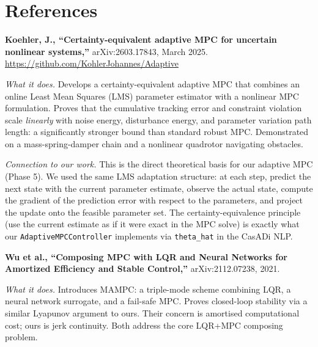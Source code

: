 \documentclass[12pt,a4paper]{article}
\begin{document}
\section*{References}

\begin{enumerate}[label={[\arabic*]}, leftmargin=1.5cm, itemsep=10pt]

  \item \textbf{Koehler, J., ``Certainty-equivalent adaptive MPC for uncertain
    nonlinear systems,''} arXiv:2603.17843, March 2025.
    \url{https://github.com/KohlerJohannes/Adaptive}

  \textit{What it does.}
  Develops a certainty-equivalent adaptive MPC that combines an online
  Least Mean Squares (LMS) parameter estimator with a nonlinear MPC
  formulation. Proves that the cumulative tracking error and constraint
  violation scale \emph{linearly} with noise energy, disturbance energy,
  and parameter variation path length: a significantly stronger bound
  than standard robust MPC. Demonstrated on a mass-spring-damper chain and
  a nonlinear quadrotor navigating obstacles.

  \textit{Connection to our work.}
  This is the direct theoretical basis for our adaptive MPC (Phase 5). We
  used the same LMS adaptation structure: at each step, predict the next
  state with the current parameter estimate, observe the actual state,
  compute the gradient of the prediction error with respect to the
  parameters, and project the update onto the feasible parameter set.
  The certainty-equivalence principle (use the current estimate as if it
  were exact in the MPC solve) is exactly what our \texttt{AdaptiveMPCController}
  implements via \texttt{theta\_hat} in the CasADi NLP.

  \medskip

  \item \textbf{Wu et al., ``Composing MPC with LQR and Neural Networks
    for Amortized Efficiency and Stable Control,''} arXiv:2112.07238, 2021.

  \textit{What it does.}
  Introduces MAMPC: a triple-mode scheme combining LQR, a neural network
  surrogate, and a fail-safe MPC. Proves closed-loop stability via a
  similar Lyapunov argument to ours. Their concern is amortised
  computational cost; ours is jerk continuity. Both address the core
  LQR+MPC composing problem.


\end{enumerate}
\end{document}
